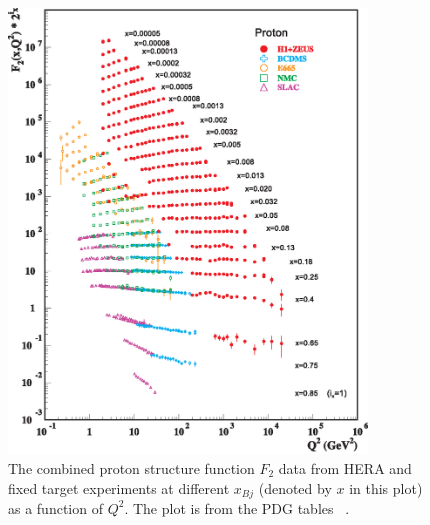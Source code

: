 \begin{figure}
\centering
\includegraphics[width=0.85\textwidth]{plots/chpt2/f2collider_logf2.eps}
\caption[Proton structure function F2] {
The combined proton structure function $F_{2}$ data from HERA and fixed target experiments at different $x_{Bj}$ (denoted by $x$ in this plot) as a function of $Q^{2}$. The plot is from the PDG tables ~\cite{Beringer:1900zz}.}
\label{fig:F2_pdg}
\end{figure}

